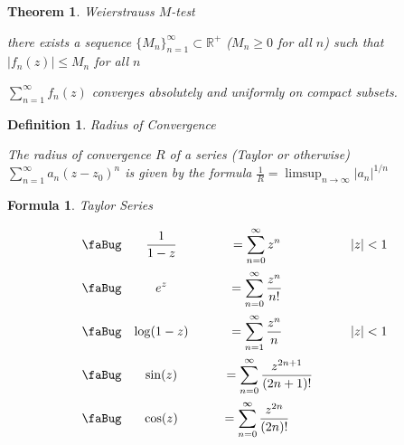 \documentclass[12pt]{Qual}
\newtheorem{theorem}{Theorem}
\newtheorem{formula}{Formula}
\newtheorem{definition}{Definition}
\begin{document}
\vspace{0.5cm}
\begin{theorem}{\Large\textit{Weierstrauss $M$-test}}

\hspace{0.1cm}\begin{minipage}{0.85\textwidth}
\vspace{0.45cm}
there exists a sequence $\{M_n\}_{n=1}^\infty\subset\mathbb{R}^+$ ($M_n\ge0$ for all $n$) such that $|f_n(z)|\le M_n$ for all $n$
\end{minipage}

 $\displaystyle\sum_{n=1}^\infty f_n(z)$ converges absolutely and uniformly on compact subsets.

\end{theorem}
\vspace{0.5cm}
\begin{definition}{\Large\textit{Radius of Convergence}}

The radius of convergence $R$ of a series (Taylor or otherwise) $\displaystyle\sum_{n=1}^\infty a_n(z-z_0)^n$ is given by the formula $\displaystyle\frac{1}{R}=\limsup_{n\to\infty}|a_n|^{1/n}$

\end{definition}
\vspace{0.5cm}
\begin{formula}{\Large\textit{Taylor Series}}
\vspace{-0.5cm}
\begin{center}
    $$\begin{matrix}
    \text{\faBug} & \displaystyle\frac{1}{1-z} &=\displaystyle\sum_{n=0}^\infty z^n &\qquad |z|<1\\[0.5cm]
   \text{\faBug} & \displaystyle e^z & =\displaystyle\sum_{n=0}^\infty\frac{z^n}{n!} &\\[0.5cm]
    \text{\faBug} & \displaystyle \log(1-z) & =\displaystyle\sum_{n=1}^\infty\frac{z^n}{n} &\qquad |z|<1\\[0.5cm]
   \text{\faBug} & \displaystyle \sin(z) & \qquad=\displaystyle\sum_{n=0}^\infty\frac{z^{2n+1}}{(2n+1)!} &\\[0.5cm]
     \text{\faBug} & \displaystyle \cos(z) & =\displaystyle\sum_{n=0}^\infty\frac{z^{2n}}{(2n)!} &\\[0.5cm]
    \end{matrix}$$
\end{center}

\end{formula}
\end{document}
